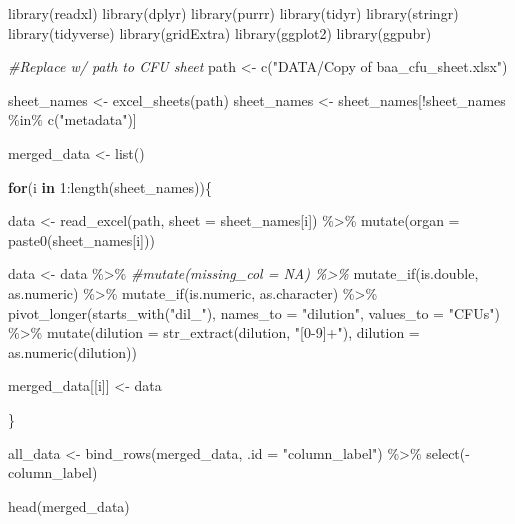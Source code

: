 \documentclass[
]{book}
\newenvironment{Shaded}{\begin{snugshade}}{\end{snugshade}}
\newcommand{\AttributeTok}[1]{\textcolor[rgb]{0.77,0.63,0.00}{#1}}
\newcommand{\CommentTok}[1]{\textcolor[rgb]{0.56,0.35,0.01}{\textit{#1}}}
\newcommand{\ControlFlowTok}[1]{\textcolor[rgb]{0.13,0.29,0.53}{\textbf{#1}}}
\newcommand{\DecValTok}[1]{\textcolor[rgb]{0.00,0.00,0.81}{#1}}
\newcommand{\FunctionTok}[1]{\textcolor[rgb]{0.00,0.00,0.00}{#1}}
\newcommand{\NormalTok}[1]{#1}
\newcommand{\OtherTok}[1]{\textcolor[rgb]{0.56,0.35,0.01}{#1}}
\newcommand{\SpecialCharTok}[1]{\textcolor[rgb]{0.00,0.00,0.00}{#1}}
\newcommand{\StringTok}[1]{\textcolor[rgb]{0.31,0.60,0.02}{#1}}
\begin{document}
\begin{Shaded}
\begin{Highlighting}[]
\FunctionTok{library}\NormalTok{(readxl)}
\FunctionTok{library}\NormalTok{(dplyr)}
\FunctionTok{library}\NormalTok{(purrr)}
\FunctionTok{library}\NormalTok{(tidyr)}
\FunctionTok{library}\NormalTok{(stringr)}
\FunctionTok{library}\NormalTok{(tidyverse)}
\FunctionTok{library}\NormalTok{(gridExtra)}
\FunctionTok{library}\NormalTok{(ggplot2)}
\FunctionTok{library}\NormalTok{(ggpubr)}

\CommentTok{\#Replace w/ path to CFU sheet}
\NormalTok{path }\OtherTok{\textless{}{-}} \FunctionTok{c}\NormalTok{(}\StringTok{"DATA/Copy of baa\_cfu\_sheet.xlsx"}\NormalTok{)}

\NormalTok{sheet\_names }\OtherTok{\textless{}{-}} \FunctionTok{excel\_sheets}\NormalTok{(path)}
\NormalTok{sheet\_names }\OtherTok{\textless{}{-}}\NormalTok{ sheet\_names[}\SpecialCharTok{!}\NormalTok{sheet\_names }\SpecialCharTok{\%in\%} \FunctionTok{c}\NormalTok{(}\StringTok{"metadata"}\NormalTok{)]}

\NormalTok{merged\_data }\OtherTok{\textless{}{-}} \FunctionTok{list}\NormalTok{()}

\ControlFlowTok{for}\NormalTok{(i }\ControlFlowTok{in} \DecValTok{1}\SpecialCharTok{:}\FunctionTok{length}\NormalTok{(sheet\_names))\{}
  
\NormalTok{  data }\OtherTok{\textless{}{-}} \FunctionTok{read\_excel}\NormalTok{(path, }\AttributeTok{sheet =}\NormalTok{ sheet\_names[i]) }\SpecialCharTok{\%\textgreater{}\%} 
    \FunctionTok{mutate}\NormalTok{(}\AttributeTok{organ =} \FunctionTok{paste0}\NormalTok{(sheet\_names[i]))}
  
\NormalTok{  data }\OtherTok{\textless{}{-}}\NormalTok{ data }\SpecialCharTok{\%\textgreater{}\%} 
    \CommentTok{\#mutate(missing\_col = NA) \%\textgreater{}\% }
    \FunctionTok{mutate\_if}\NormalTok{(is.double, as.numeric) }\SpecialCharTok{\%\textgreater{}\%} 
    \FunctionTok{mutate\_if}\NormalTok{(is.numeric, as.character) }\SpecialCharTok{\%\textgreater{}\%} 
    \FunctionTok{pivot\_longer}\NormalTok{(}\FunctionTok{starts\_with}\NormalTok{(}\StringTok{"dil\_"}\NormalTok{), }\AttributeTok{names\_to =} \StringTok{"dilution"}\NormalTok{,}
                 \AttributeTok{values\_to =} \StringTok{"CFUs"}\NormalTok{) }\SpecialCharTok{\%\textgreater{}\%} 
    \FunctionTok{mutate}\NormalTok{(}\AttributeTok{dilution =} \FunctionTok{str\_extract}\NormalTok{(dilution, }\StringTok{"[0{-}9]+"}\NormalTok{),}
           \AttributeTok{dilution =} \FunctionTok{as.numeric}\NormalTok{(dilution))}
    
  
\NormalTok{  merged\_data[[i]] }\OtherTok{\textless{}{-}}\NormalTok{ data}
  
  
\NormalTok{\}}
  
\NormalTok{all\_data }\OtherTok{\textless{}{-}} \FunctionTok{bind\_rows}\NormalTok{(merged\_data, }\AttributeTok{.id =} \StringTok{"column\_label"}\NormalTok{) }\SpecialCharTok{\%\textgreater{}\%} 
    \FunctionTok{select}\NormalTok{(}\SpecialCharTok{{-}}\NormalTok{column\_label)}
  
\FunctionTok{head}\NormalTok{(merged\_data)}
\end{Highlighting}
\end{Shaded}
\end{document}
